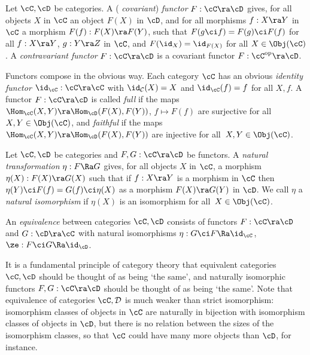 \documentclass{article}
\begin{document}
\begin{dfn} Let $\cC,\cD$ be categories. A ({\it
covariant\/}) {\it functor}
$F:\cC\ra\cD$ gives, for all objects $X$ in $\cC$ an object $F(X)$
in $\cD$, and for all morphisms $f:X\ra Y$ in $\cC$ a morphism
$F(f):F(X)\ra F(Y)$, such that $F(g\ci f)=F(g)\ci F(f)$ for all
$f:X\ra Y$, $g:Y\ra Z$ in $\cC$, and $F(\id_X)=\id_{F(X)}$ for all
$X\in\Obj(\cC)$. A {\it contravariant functor\/} $F:\cC\ra\cD$ is a
covariant functor $F:\cC^{\rm op}\ra\cD$.

Functors compose in the obvious way. Each category $\cC$ has an
obvious {\it identity functor\/} $\id_\cC:\cC\ra\cC$ with $\id_{\cal
C}(X)=X$ and $\id_\cC(f)=f$ for all $X,f$. A functor $F:\cC\ra\cD$
is called {\it full\/} if
the maps $\Hom_\cC(X,Y)\ra\Hom_\cD (F(X),F(Y))$, $f\mapsto F(f)$ are
surjective for all $X,Y\in\Obj(\cC)$, and {\it
faithful\/} if the
maps $\Hom_\cC(X,Y)\ra\Hom_\cD(F(X),F(Y))$ are injective for
all~$X,Y\in\Obj(\cC)$.

Let $\cC,\cD$ be categories and $F,G:\cC\ra\cD$ be functors. A {\it
natural transformation\/}
$\eta:F\Ra G$ gives, for all objects $X$ in $\cC$, a morphism
$\eta(X):F(X)\ra G(X)$ such that if $f:X\ra Y$ is a morphism in
$\cC$ then $\eta(Y)\ci F(f)=G(f)\ci\eta(X)$ as a morphism $F(X)\ra
G(Y)$ in $\cD$. We call $\eta$ a {\it natural
isomorphism\/} if $\eta(X)$ is
an isomorphism for all~$X\in\Obj(\cC)$.

An {\it equivalence\/} between categories
$\cC,\cD$ consists of functors $F:\cC\ra\cD$ and $G:\cD\ra\cC$ with
natural isomorphisms $\eta:G\ci F\Ra\id_\cC$, $\ze:F\ci
G\Ra\id_\cD$.
\label{dsAdef2}
\end{dfn}

It is a fundamental principle of category theory that equivalent
categories $\cC,\cD$ should be thought of as being `the same', and
naturally isomorphic functors $F,G:\cC\ra\cD$ should be thought of
as being `the same'. Note that equivalence of categories $\cC,{\cal
D}$ is much weaker than strict isomorphism: isomorphism classes of
objects in $\cC$ are naturally in bijection with isomorphism classes
of objects in $\cD$, but there is no relation between the sizes of
the isomorphism classes, so that $\cC$ could have many more objects
than $\cD$, for instance.
\end{document}
